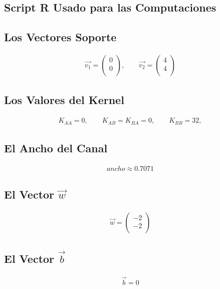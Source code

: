 \documentclass[fleqn]{llncs}
\begin{document}
\subsection{Script R Usado para las Computaciones}


\newpage

\subsection{Los Vectores Soporte}
\begin{align*}
	\overrightarrow{v_1} =
		\begin{pmatrix}
			0 \\
			0 \\
		\end{pmatrix},
	\qquad
	\overrightarrow{v_2} =
		\begin{pmatrix}
			4 \\
			4 \\
		\end{pmatrix}
\end{align*}

\subsection{Los Valores del Kernel}
\begin{align*}
	K_{AA} = 0,
	\qquad
	K_{AB} = K_{BA} = 0,
	\qquad
	K_{BB} = 32,
\end{align*}

\subsection{El Ancho del Canal}
\begin{align*}
	ancho \approx 0.7071
\end{align*}

\subsection{El Vector $\overrightarrow{w}$}
\begin{align*}
	\overrightarrow{w} =
		\begin{pmatrix}
			-2 \\
			-2 \\
		\end{pmatrix}
\end{align*}

\subsection{El Vector $\overrightarrow{b}$}
\begin{align*}
	\overrightarrow{b} = 0
\end{align*}
\end{document}
